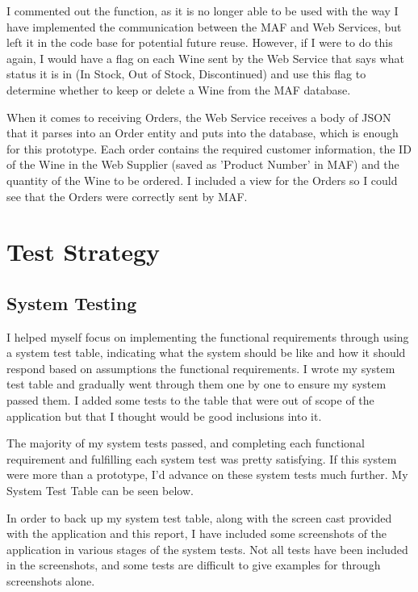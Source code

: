\documentclass[12pt]{article}
\begin{document}
I commented out the function, as it is no longer able to be used with the way I have implemented the communication between the MAF and Web Services, but left it in the code base for potential future reuse. However, if I were to do this again, I would have a flag on each Wine sent by the Web Service that says what status it is in (In Stock, Out of Stock, Discontinued) and use this flag to determine whether to keep or delete a Wine from the MAF database.

When it comes to receiving Orders, the Web Service receives a body of JSON that it parses into an Order entity and puts into the database, which is enough for this prototype. Each order contains the required customer information, the ID of the Wine in the Web Supplier (saved as 'Product Number' in MAF) and the quantity of the Wine to be ordered. I included a view for the Orders so I could see that the Orders were correctly sent by MAF.



\section{Test Strategy}
\subsection{System Testing}
I helped myself focus on implementing the functional requirements through using a system test table, indicating what the system should be like and how it should respond based on assumptions the functional requirements. I wrote my system test table and gradually went through them one by one to ensure my system passed them. I added some tests to the table that were out of scope of the application but that I thought would be good inclusions into it.

The majority of my system tests passed, and completing each functional requirement and fulfilling each system test was pretty satisfying. If this system were more than a prototype, I'd advance on these system tests much further. My System Test Table can be seen below.



In order to back up my system test table, along with the screen cast provided with the application and this report, I have included some screenshots of the application in various stages of the system tests. Not all tests have been included in the screenshots, and some tests are difficult to give examples for through screenshots alone.
\end{document}
